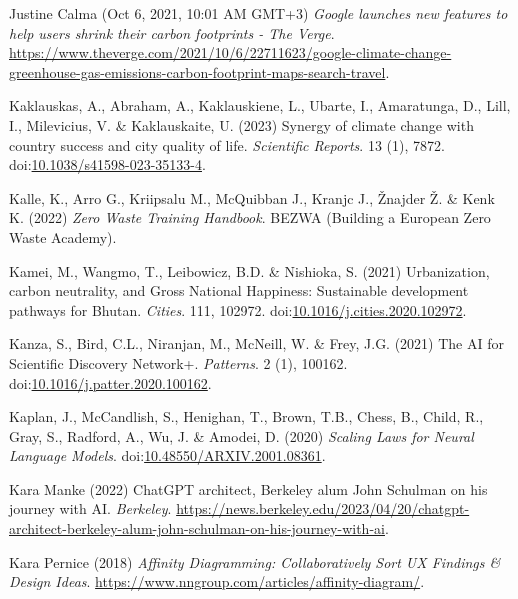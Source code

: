 \documentclass[
  letterpaper,
  DIV=11,
  numbers=noendperiod]{scrartcl}
\newlength{\cslhangindent}
\newenvironment{CSLReferences}[2] %
 {\begin{list}{}{%
  \setlength{\itemindent}{0pt}
  \setlength{\leftmargin}{0pt}
  \setlength{\parsep}{0pt}
  \ifodd #1
   \setlength{\leftmargin}{\cslhangindent}
   \setlength{\itemindent}{-1\cslhangindent}
  \fi
  \setlength{\itemsep}{#2\baselineskip}}}
 {\end{list}}
\begin{document}
\begin{CSLReferences}{0}{1}
Justine Calma (Oct 6, 2021, 10:01 AM GMT+3) \emph{Google launches new
features to help users shrink their carbon footprints - {The Verge}}.
\url{https://www.theverge.com/2021/10/6/22711623/google-climate-change-greenhouse-gas-emissions-carbon-footprint-maps-search-travel}.

Kaklauskas, A., Abraham, A., Kaklauskiene, L., Ubarte, I., Amaratunga,
D., Lill, I., Milevicius, V. \& Kaklauskaite, U. (2023) Synergy of
climate change with country success and city quality of life.
\emph{Scientific Reports}. 13 (1), 7872.
doi:\href{https://doi.org/10.1038/s41598-023-35133-4}{10.1038/s41598-023-35133-4}.

Kalle, K., Arro G., Kriipsalu M., McQuibban J., Kranjc J., Žnajder Ž. \&
Kenk K. (2022) \emph{Zero {Waste Training Handbook}}. BEZWA (Building a
European Zero Waste Academy).

Kamei, M., Wangmo, T., Leibowicz, B.D. \& Nishioka, S. (2021)
Urbanization, carbon neutrality, and {Gross National Happiness}:
{Sustainable} development pathways for {Bhutan}. \emph{Cities}. 111,
102972.
doi:\href{https://doi.org/10.1016/j.cities.2020.102972}{10.1016/j.cities.2020.102972}.

Kanza, S., Bird, C.L., Niranjan, M., McNeill, W. \& Frey, J.G. (2021)
The {AI} for {Scientific Discovery Network}+. \emph{Patterns}. 2 (1),
100162.
doi:\href{https://doi.org/10.1016/j.patter.2020.100162}{10.1016/j.patter.2020.100162}.

Kaplan, J., McCandlish, S., Henighan, T., Brown, T.B., Chess, B., Child,
R., Gray, S., Radford, A., Wu, J. \& Amodei, D. (2020) \emph{Scaling
{Laws} for {Neural Language Models}}.
doi:\href{https://doi.org/10.48550/ARXIV.2001.08361}{10.48550/ARXIV.2001.08361}.

Kara Manke (2022) {ChatGPT} architect, {Berkeley} alum {John Schulman}
on his journey with {AI}. \emph{Berkeley}.
\url{https://news.berkeley.edu/2023/04/20/chatgpt-architect-berkeley-alum-john-schulman-on-his-journey-with-ai}.

Kara Pernice (2018) \emph{Affinity {Diagramming}: {Collaboratively Sort
UX Findings} \& {Design Ideas}}.
\url{https://www.nngroup.com/articles/affinity-diagram/}.


\end{CSLReferences}
\end{document}
